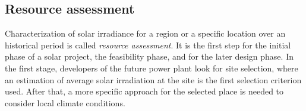

\subsection{Resource assessment}

Characterization of solar irradiance for a region or a specific location over an historical period is called \textit{resource assessment}. It is the first step for the initial phase of a solar project, the feasibility phase, and for the later design phase. In the first stage, developers of the future power plant look for site selection, where an estimation of average solar irradiation at the site is the first selection criterion used. After that, a more specific approach for the selected place is needed to consider local climate conditions.

